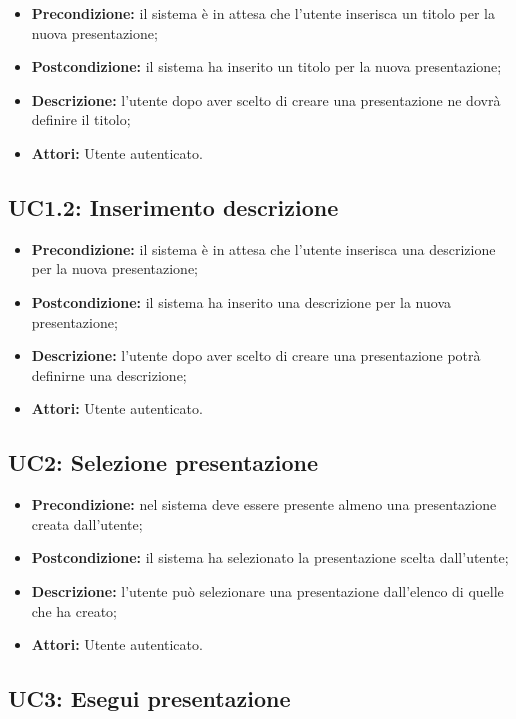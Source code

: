 \begin{itemize}
	\item \textbf{Precondizione:} il sistema è in attesa che l'utente inserisca un titolo per la nuova presentazione;
	\item \textbf{Postcondizione:} il sistema ha inserito un titolo per la nuova presentazione;
	\item \textbf{Descrizione:} l'utente dopo aver scelto di creare una presentazione ne dovrà definire il titolo;
	\item \textbf{Attori:} Utente autenticato.
\end{itemize}
\subsection{ UC1.2: Inserimento descrizione}

\begin{itemize}
	\item \textbf{Precondizione:} il sistema è in attesa che l'utente inserisca una descrizione per la nuova presentazione;
	\item \textbf{Postcondizione:} il sistema ha inserito una descrizione per la nuova presentazione;
	\item \textbf{Descrizione:} l'utente dopo aver scelto di creare una presentazione potrà definirne una descrizione;
	\item \textbf{Attori:} Utente autenticato.
\end{itemize}
\subsection{ UC2: Selezione presentazione}

\begin{itemize}
	\item \textbf{Precondizione:} nel sistema deve essere presente almeno una presentazione creata dall'utente;
	\item \textbf{Postcondizione:} il sistema ha selezionato la presentazione scelta dall'utente;
	\item \textbf{Descrizione:} l'utente può selezionare una presentazione dall'elenco di quelle che ha creato;
	\item \textbf{Attori:} Utente autenticato.
\end{itemize}
\subsection{ UC3: Esegui presentazione}

